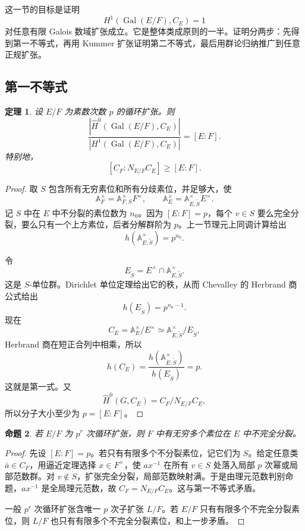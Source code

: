 \documentclass[11pt,a4paper,openany]{ctexbook}
\numberwithin{equation}{chapter}
\newcommand{\A}{\mathbb{A}}
\newcommand{\Gal}{\operatorname{Gal}}
\theoremstyle{plain}
\newtheorem{theorem}{定理}[chapter]
\newtheorem{proposition}[theorem]{命题}
\theoremstyle{definition}
\theoremstyle{remark}
\begin{document}
这一节的目标是证明
\[
H^1(\Gal(E/F),C_E)=1
\]
对任意有限 Galois 数域扩张成立。它是整体类成原则的一半。证明分两步：先得到第一不等式，再用 Kummer 扩张证明第二不等式，最后用群论归纳推广到任意正规扩张。

\subsection{第一不等式}

\begin{theorem}
设 $E/F$ 为素数次数 $p$ 的循环扩张。则
\[
\frac{|\widehat H^0(\Gal(E/F),C_E)|}{|H^1(\Gal(E/F),C_E)|}=[E:F].
\]
特别地，
\[
[C_F:N_{E/F}C_E]\ge [E:F].
\]
\end{theorem}

\begin{proof}
取 $S$ 包含所有无穷素位和所有分歧素位，并足够大，使
\[
\A_F^\times=\A_{F,S}^\times F^\times,\qquad
\A_E^\times=\A_{E,\widetilde S}^\times E^\times.
\]
记 $S$ 中在 $E$ 中不分裂的素位数为 $n_0$。因为 $[E:F]=p$，每个 $v\in S$ 要么完全分裂，要么只有一个上方素位，后者分解群阶为 $p$。上一节理元上同调计算给出
\[
h(\A_{E,\widetilde S}^\times)=p^{n_0}.
\]

令
\[
E_{\widetilde S}=E^\times\cap\A_{E,\widetilde S}^\times.
\]
这是 $S$-单位群。Dirichlet 单位定理给出它的秩，从而 Chevalley 的 Herbrand 商公式给出
\[
h(E_{\widetilde S})=p^{n_0-1}.
\]
现在
\[
C_E=\A_E^\times/E^\times\simeq \A_{E,\widetilde S}^\times/E_{\widetilde S},
\]
Herbrand 商在短正合列中相乘，所以
\[
h(C_E)=\frac{h(\A_{E,\widetilde S}^\times)}{h(E_{\widetilde S})}=p.
\]
这就是第一式。又
\[
\widehat H^0(G,C_E)=C_F/N_{E/F}C_E,
\]
所以分子大小至少为 $p=[E:F]$。
\end{proof}

\begin{proposition}
若 $E/F$ 为 $p^r$ 次循环扩张，则 $F$ 中有无穷多个素位在 $E$ 中不完全分裂。
\end{proposition}

\begin{proof}
先设 $[E:F]=p$。若只有有限多个不分裂素位，记它们为 $S$。给定任意类 $\bar a\in C_F$，用逼近定理选择 $x\in F^\times$，使 $ax^{-1}$ 在所有 $v\in S$ 处落入局部 $p$ 次幂或局部范数群。对 $v\notin S$，扩张完全分裂，局部范数映射满。于是由理元范数判别命题，$ax^{-1}$ 是全局理元范数，故 $C_F=N_{E/F}C_E$。这与第一不等式矛盾。

一般 $p^r$ 次循环扩张含唯一 $p$ 次子扩张 $L/F$。若 $E/F$ 只有有限多个不完全分裂素位，则 $L/F$ 也只有有限多个不完全分裂素位，和上一步矛盾。
\end{proof}
\end{document}
